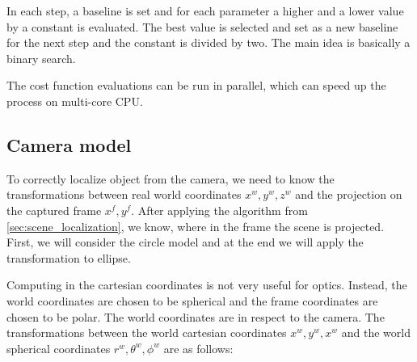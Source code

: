 \documentclass[a4paper,12pt,titlepage]{article}
\numberwithin{figure}{section}
\begin{document}
In each step, a baseline is set and for each parameter a higher and a lower value by a constant is evaluated. The best value is selected and set as a new baseline for the next step and the constant is divided by two. The main idea is basically a binary search.


%
%
%    
%    
%    

The cost function evaluations can be run in parallel, which can speed up the process on multi-core CPU.

\subsection{Camera model}

To correctly localize object from the camera, we need to know the transformations between real world coordinates $x^w, y^w, z^w$ and the projection on the captured frame $x^f, y^f$. After applying the algorithm from \ref{sec:scene_localization}, we know, where in the frame the scene is projected. First, we will consider the circle model and at the end we will apply the transformation to ellipse. 

Computing in the cartesian coordinates is not very useful for optics. Instead, the world coordinates are chosen to be spherical and the frame coordinates are chosen to be polar. The world coordinates are in respect to the camera. 
The transformations between the world cartesian coordinates $x^w, y^w, x^w$ and the world spherical coordinates $r^w, \theta^w, \phi^w$ are as follows:
\end{document}
